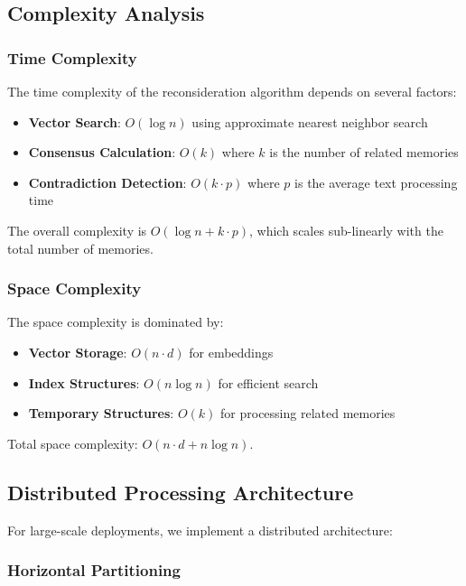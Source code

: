 \documentclass[12pt,a4paper]{article}
\begin{document}
\subsection{Complexity Analysis}

\subsubsection{Time Complexity}

The time complexity of the reconsideration algorithm depends on several factors:

\begin{itemize}
\item \textbf{Vector Search}: $O(\log n)$ using approximate nearest neighbor search
\item \textbf{Consensus Calculation}: $O(k)$ where $k$ is the number of related memories
\item \textbf{Contradiction Detection}: $O(k \cdot p)$ where $p$ is the average text processing time
\end{itemize}

The overall complexity is $O(\log n + k \cdot p)$, which scales sub-linearly with the total number of memories.

\subsubsection{Space Complexity}

The space complexity is dominated by:

\begin{itemize}
\item \textbf{Vector Storage}: $O(n \cdot d)$ for embeddings
\item \textbf{Index Structures}: $O(n \log n)$ for efficient search
\item \textbf{Temporary Structures}: $O(k)$ for processing related memories
\end{itemize}

Total space complexity: $O(n \cdot d + n \log n)$.

\subsection{Distributed Processing Architecture}

For large-scale deployments, we implement a distributed architecture:

\subsubsection{Horizontal Partitioning}
\end{document}
